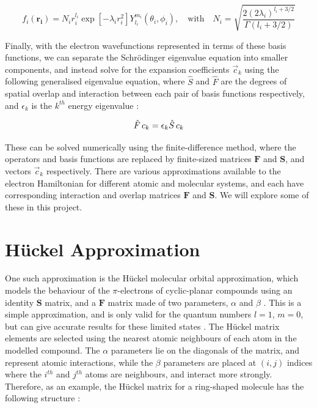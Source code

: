 \begin{equation}\label{eq:Gaussian}
f_i(\boldsymbol{r_i})=N_ir_i^{l_i}\exp[-\lambda_ir_i^2]Y_{l_i}^{m_i}(\theta_i,\phi_i), \quad \mathrm{with} \quad N_i=\sqrt{\frac{2(2\lambda_i)^{l_i+3/2}}{\Gamma(l_i+3/2)}}
\end{equation}


Finally, with the electron wavefunctions represented in terms of these basis functions, we can separate the Schrödinger eigenvalue equation into smaller components, and instead solve for the expansion coefficients $\vec{c}_k$ using the following generalised eigenvalue equation, where $\hat{S}$ and $\hat{F}$ are the degrees of spatial overlap and interaction between each pair of basis functions respectively, and $\epsilon_k$ is the $k^{th}$ energy eigenvalue \cite{quiney_art_nodate}:

\begin{equation}\label{eq:eigenvalue}
\hat{F}\thinspace c_k=\epsilon_k \hat{S} \thinspace c_k
\end{equation}

These can be solved numerically using the finite-difference method, where the operators and basis functions are replaced by finite-sized matrices $\boldsymbol{F}$ and $\boldsymbol{S}$, and vectors $\vec{c}_k$ respectively. There are various approximations available to the electron Hamiltonian for different atomic and molecular systems, and each have corresponding interaction and overlap matrices $\boldsymbol{F}$ and $\boldsymbol{S}$. We will explore some of these in this project.


\section{Hückel Approximation}\label{sec:huckel}

One such approximation is the Hückel molecular orbital approximation, which models the behaviour of the $\pi$-electrons of cyclic-planar compounds using an identity $\boldsymbol{S}$ matrix, and a $\boldsymbol{F}$ matrix made of two parameters, $\alpha$ and $\beta$ \cite{quiney_art_nodate}. This is a simple approximation, and is only valid for the quantum numbers $l=1$, $m=0$, but can give accurate results for these limited states \cite{yates_huckel_2012}. The Hückel matrix elements are selected using the nearest atomic neighbours of each atom in the modelled compound. The $\alpha$ parameters lie on the diagonals of the matrix, and represent atomic interactions, while the $\beta$ parameters are placed at $(i,j)$ indices where the $i^{th}$ and $j^{th}$ atoms are neighbours, and interact more strongly. Therefore, as an example, the Hückel matrix for a ring-shaped molecule has the following structure \cite{quiney_art_nodate}:\\

